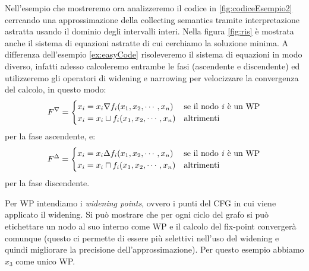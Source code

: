 \begin{example}\label{ex:esempio2}
Nell'esempio che mostreremo ora analizzeremo il codice in \ref{fig:codiceEsempio2} cerrcando una approssimazione della collecting semantics tramite interpretazione astratta usando il dominio degli intervalli interi. Nella figura \ref{fig:ris} è mostrata anche il sistema di equazioni astratte di cui cerchiamo la soluzione minima. A differenza dell'esempio \ref{ex:easyCode} risoleveremo il sistema di equazioni in modo diverso, infatti adesso calcoleremo entrambe le fasi (ascendente e discendente) ed utilizzeremo gli operatori di widening e narrowing per velocizzare la convergenza del calcolo, in questo modo: 
\[
F^{\nabla} = 
\begin{cases}
    x_i = x_i \nabla f_i(x_1, x_2, \cdots, x_n) & \textrm{se il nodo \textit{i} è un WP} \\
    x_i = x_i \sqcup f_i(x_1, x_2, \cdots, x_n) & \textrm{altrimenti} \\
\end{cases}
\]
per la fase ascendente, e:
\[
F^{\Delta} = 
\begin{cases}
    x_i = x_i \Delta f_i(x_1, x_2, \cdots, x_n) & \textrm{se il nodo \textit{i} è un WP} \\
    x_i = x_i \sqcap f_i(x_1, x_2, \cdots, x_n) & \textrm{altrimenti} \\
\end{cases}
\]
per la fase discendente.

Per WP intendiamo i \textit{widening points}, ovvero i punti del CFG in cui viene applicato il widening. Si può mostrare che per ogni ciclo del grafo si può etichettare un nodo al suo interno come WP e il calcolo del fix-point convergerà comunque (questo ci permette di essere più selettivi nell'uso del widening e quindi migliorare la precisione dell'approssimazione). Per questo esempio abbiamo \(x_3\) come unico WP.


\end{example}
